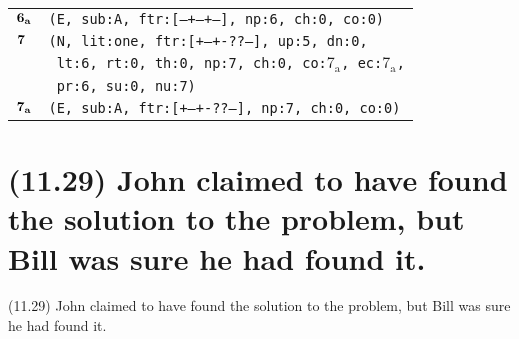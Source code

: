 \documentclass{article}
\begin{document}
\begin{minipage}{\textwidth}
{\begin{tabular}{|r|l|}
    ${\textbf{\textrm{6}}_{\textbf{\textrm{a}}}}$ & \texttt{\texttt{(E,~sub:A,~ftr:[---+--+--],~np:6,~ch:0,~co:0)}} \\
    ${\textbf{\textrm{7}}_{\phantom{z}}}$ & \texttt{\texttt{(N,~lit:one,~ftr:[+--+-??--],~up:5,~dn:0,}} \\
    & \texttt{\texttt{~lt:6,~rt:0,~th:0,~np:7,~ch:0,~co:${\textrm{7}_{\textrm{a}}}$,~ec:${\textrm{7}_{\textrm{a}}}$,}} \\
    & \texttt{\texttt{~pr:6,~su:0,~nu:7)}} \\
    ${\textbf{\textrm{7}}_{\textbf{\textrm{a}}}}$ & \texttt{\texttt{(E,~sub:A,~ftr:[+--+-??--],~np:7,~ch:0,~co:0)}} \\
    \hline
  \end{tabular}
  }
\end{minipage}
\bigbreak

\clearpage

%
%

\section*{(11.29) John claimed to have found the solution to the problem, but Bill was sure he had found it.}

\bigbreak
\begin{enumerate*}
\item[(11.29)] John claimed to have found the solution to the problem, but Bill was sure he had found it.
\end{enumerate*}
\bigbreak
\end{document}
